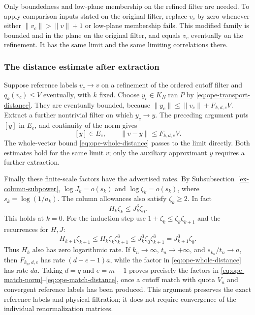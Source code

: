 Only boundedness and low-plane membership on the refined filter are
needed. To apply comparison inputs stated on the original filter,
replace $v_c$ by zero whenever either $\|v_c\|>\|v\|+1$ or low-plane
membership fails. This modified family is bounded and in the plane
on the original filter, and equals $v_c$ eventually on the refinement.
It has the same limit and the same limiting correlations there.

\subsubsection{The distance estimate after extraction}
Suppose reference labels $v_c\to v$ on a refinement of the ordered
cutoff filter and $q_k(v_c)\leq V$ eventually, with $k$ fixed.
Choose $y_c\in K_N\operatorname{ran}P$ by
\eqref{eq:ope-transport-distance}. They are eventually bounded, because
$\|y_c\|\leq\|v_c\|+F_{k,d,e}V$. Extract a further nontrivial filter
on which $y_c\to y$. The preceding argument puts $[y]$ in $E_e$,
and continuity of the norm gives
\begin{equation}\label{eq:ope-physical-distance}
 [y]\in E_e,\qquad \|v-y\|\leq F_{k,d,e}V.
\end{equation}
The whole-vector bound \eqref{eq:ope-whole-distance} passes to the
limit directly. Both estimates hold for the same limit $v$; only the
auxiliary approximant $y$ requires a further extraction.

Finally these finite-scale factors have the advertised rates. By Subsubsection~\ref{ex-column-subpower},
$\log J_k=o(s_k)$ and $\log\zeta_k=o(s_k)$, where
$s_k=\log(1/a_k)$. The column allowances also satisfy $\zeta_k\geq2$.
In fact
\[
 H_k\zeta_k\leq J_k^3\zeta_0.
\]
This holds at $k=0$. For the induction step use
$1+\zeta_k\leq\zeta_k\zeta_{k+1}$ and the recurrences for $H,J$:
\[
 H_{k+1}\zeta_{k+1}
 \leq H_k\zeta_k\zeta_{k+1}^3
 \leq J_k^3\zeta_0\zeta_{k+1}^3
 =J_{k+1}^3\zeta_0.
\]
Thus $H_k$ also has zero logarithmic rate. If $k_n\to\infty$, $t_n\to+\infty$, and $s_{k_n}/t_n\to a$,
then $F_{k_n,d,e}$ has rate $(d-e-1)a$, while the factor in
\eqref{eq:ope-whole-distance} has rate $da$.
Taking $d=q$ and $e=m-1$ proves precisely the factors in
\eqref{eq:ope-match-norm}--\eqref{eq:ope-match-distance}, once a
cutoff match with quota $V_n$ and convergent reference labels has been
produced. This argument preserves the exact reference labels and
physical filtration; it does not require convergence of the individual
renormalization matrices.
